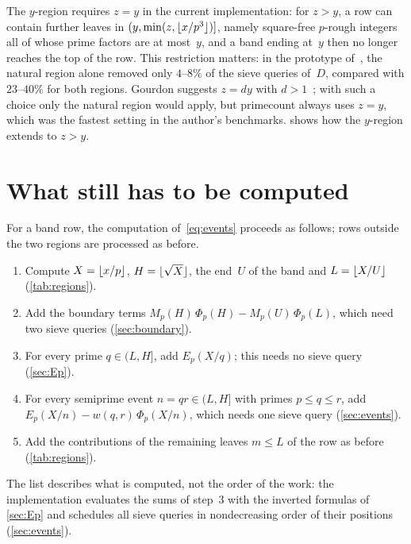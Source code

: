 \documentclass[11pt,a4paper]{amsart}
\numberwithin{equation}{section}
\DeclarePairedDelimiter{\floor}{\lfloor}{\rfloor}
\begin{document}
The $y$-region requires $z=y$ in the current implementation: for $z>y$, a row
can contain further leaves in $(y,\min(z,\floor{x/p^3})]$, namely square-free
$p$-rough integers all of whose prime factors are at most~$y$, and a band ending
at~$y$ then no longer reaches the top of the row. This restriction matters: in
the prototype of~\cite[\S8]{Lin2026}, the natural region alone removed only
$4$--$8\%$ of the sieve queries of~$D$, compared with $23$--$40\%$ for both
regions. Gourdon suggests $z=dy$ with $d>1$~\cite[\S2]{Gourdon2001}; with such a
choice only the natural region would apply, but primecount always uses $z=y$,
which was the fastest setting in the author's benchmarks.
 shows how the $y$-region extends to $z>y$.

\section{What still has to be computed}\label{sec:remaining}

For a band row, the computation of~\eqref{eq:events} proceeds as follows; rows
outside the two regions are processed as before.
\begin{enumerate}
\item Compute $X=\floor{x/p}$, $H=\floor{\sqrt X}$, the end~$U$ of the band and
$L=\floor{X/U}$ (\cref{tab:regions}).
\item Add the boundary terms $M_p(H)\,\Phi_p(H)-M_p(U)\,\Phi_p(L)$, which need two
sieve queries (\cref{sec:boundary}).
\item For every prime $q\in(L,H]$, add $E_p(X/q)$; this needs no sieve query
(\cref{sec:Ep}).
\item For every semiprime event $n=qr\in(L,H]$ with primes $p\le q\le r$, add
$E_p(X/n)-w(q,r)\,\Phi_p(X/n)$, which needs one sieve query (\cref{sec:events}).
\item Add the contributions of the remaining leaves $m\le L$ of the row as before
(\cref{tab:regions}).
\end{enumerate}
The list describes what is computed, not the order of the work: the
implementation evaluates the sums of step~3 with the inverted formulas of
\cref{sec:Ep} and schedules all sieve queries in nondecreasing order of their
positions (\cref{sec:events}).
\end{document}
